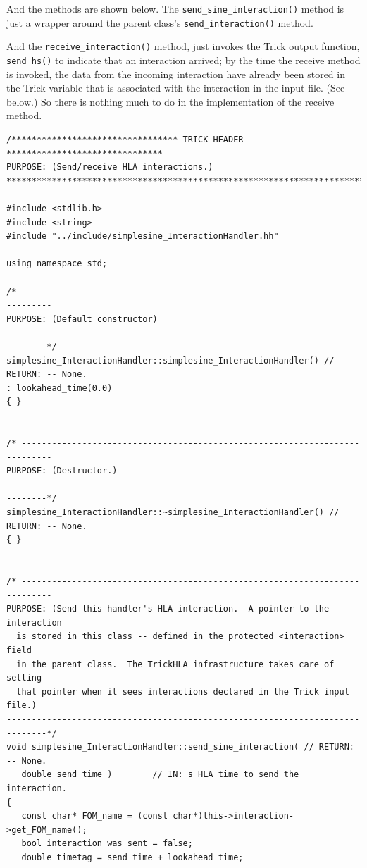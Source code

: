 And the methods are shown below.
The {\tt send\_sine\_interaction()} method is just a wrapper around the
parent class's {\tt send\_interaction()} method.

And the {\tt receive\_interaction()} method, just invokes the Trick
output function, {\tt send\_hs()} to indicate that an interaction arrived;
by the time the receive method is invoked,
the data from the incoming interaction have already been stored in the
Trick variable that is associated with the interaction in the input
file.  (See below.)
So there is nothing much to do in the implementation of the receive method.

\begin{lstlisting}[caption={{\tt simplesine\_InteractionHandler} methods},label={list:simplesine-interaction-handler-methods}]
/********************************* TRICK HEADER *******************************
PURPOSE: (Send/receive HLA interactions.)
*******************************************************************************/

#include <stdlib.h>
#include <string>
#include "../include/simplesine_InteractionHandler.hh"

using namespace std;

/* ----------------------------------------------------------------------------
PURPOSE: (Default constructor)
------------------------------------------------------------------------------*/
simplesine_InteractionHandler::simplesine_InteractionHandler() // RETURN: -- None.
: lookahead_time(0.0)
{ }


/* ----------------------------------------------------------------------------
PURPOSE: (Destructor.)
------------------------------------------------------------------------------*/
simplesine_InteractionHandler::~simplesine_InteractionHandler() // RETURN: -- None.
{ }


/* ----------------------------------------------------------------------------
PURPOSE: (Send this handler's HLA interaction.  A pointer to the interaction
  is stored in this class -- defined in the protected <interaction> field
  in the parent class.  The TrickHLA infrastructure takes care of setting
  that pointer when it sees interactions declared in the Trick input file.)
------------------------------------------------------------------------------*/
void simplesine_InteractionHandler::send_sine_interaction( // RETURN: -- None.
   double send_time )        // IN: s HLA time to send the interaction.
{
   const char* FOM_name = (const char*)this->interaction->get_FOM_name();
   bool interaction_was_sent = false;
   double timetag = send_time + lookahead_time;


\end{lstlisting}
